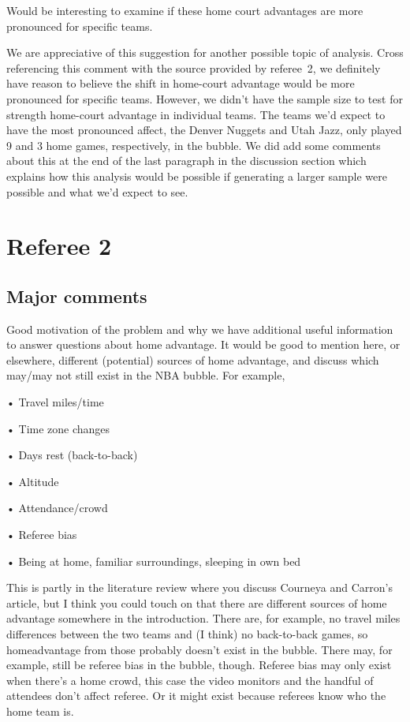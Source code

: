 \documentclass[12pt]{article}
\newenvironment{comment}%
{\begin{quoting}\noindent\small\it\ignorespaces%
  }{\end{quoting}}
\begin{document}
\begin{comment}
Would be interesting to examine if these home court advantages are 
more pronounced for specific teams.
\end{comment}

 We are appreciative of this suggestion for another possible topic of analysis. 
 Cross referencing this comment with the source provided by referee~2, we definitely 
 have reason to believe the shift in home-court advantage would be more pronounced 
 for specific teams. However, we didn't have the sample size to test for strength 
 home-court advantage in individual teams. The teams we'd expect to have the 
 most pronounced affect, the Denver Nuggets and Utah Jazz, only played 9 and 3
 home games, respectively, in the bubble. We did add some comments about this 
 at the end of the last paragraph in the discussion section which explains
 how this analysis would be possible if generating a larger sample were
 possible and what we'd expect to see.


\section*{Referee 2}

\subsection*{Major comments}

\begin{comment}
Good motivation of the problem and why we have additional useful information
to answer questions about
home advantage.
It would be good to mention here, or elsewhere, different (potential) 
sources of home advantage, and discuss
which may/may not still exist in the NBA bubble. For example,
\item
• Travel miles/time
\item
• Time zone changes
\item
• Days rest (back-to-back)
\item
• Altitude
\item
• Attendance/crowd
\item
• Referee bias
\item
• Being at home, familiar surroundings, sleeping in own bed
\item
This is partly in the literature review where you discuss Courneya and Carron’s article,
but I think you could touch on that there are different sources of home advantage 
somewhere in the introduction. There are, for example, no travel miles differences between the 
two teams and (I think) no back-to-back games, so homeadvantage from those probably doesn’t 
exist in the bubble. There may, for example, still be referee bias in
the bubble, though. Referee bias may only exist when there’s a home crowd, this
case the video monitors and the handful of attendees don’t affect referee. 
Or it might exist because referees know who the home team is.
\end{comment}
\end{document}
